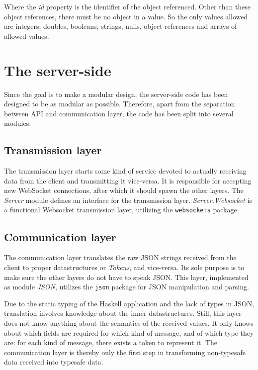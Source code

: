 \documentclass[11pt,a4paper]{article}
\begin{document}
Where the \textit{id} property is the identifier of the object referenced.
Other than these object references, there must be no object in a value.
So the only values allowed are integers, doubles, booleans, strings, nulls, object references and arrays of allowed values.

\newpage
\section{The server-side}

Since the goal is to make a modular design, the server-side code has been designed to be as modular as possible.
Therefore, apart from the separation between API and communication layer, the code has been split into several modules.

\subsection{Transmission layer}
The transmission layer starts some kind of service devoted to actually receiving data from the client and transmitting it vice-versa.
It is responsible for accepting new WebSocket connections, after which it should spawn the other layers.
The \textit{Server} module defines an interface for the transmission layer.
\textit{Server.Websocket} is a functional Websocket transmission layer, utilizing the \texttt{websockets} package.

\subsection{Communication layer}
The communication layer translates the raw JSON strings received from the client to proper datastructures or \textit{Tokens}, and vice-versa.
Its sole purpose is to make sure the other layers do not have to speak JSON.
This layer, implemented as module \textit{JSON}, utilizes the \texttt{json} package for JSON manipulation and parsing.

Due to the static typing of the Haskell application and the lack of types in JSON, translation involves knowledge about the inner datastructures.
Still, this layer does not know anything about the semantics of the received values.
It only knows about which fields are required for which kind of message, and of which type they are: for each kind of message, there exists a token to represent it.
The communication layer is thereby only the first step in transforming non-typesafe data received into typesafe data.
\end{document}

